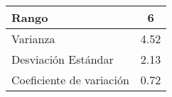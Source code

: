 \begin{footnotesize}
\begin{minipage}[ht]{0.4\textwidth}
\begin{tabular}{lc}
            \midrule
            Rango & 6 \\
            \midrule
            Varianza & 4.52 \\
            \midrule
            Desviación Estándar & 2.13 \\
            \midrule
            Coeficiente de variación & 0.72 \\
            \bottomrule
        \end{tabular}
        \label{tab:variableContinuaMedidasDispersion}
    \end{minipage}
\end{footnotesize}